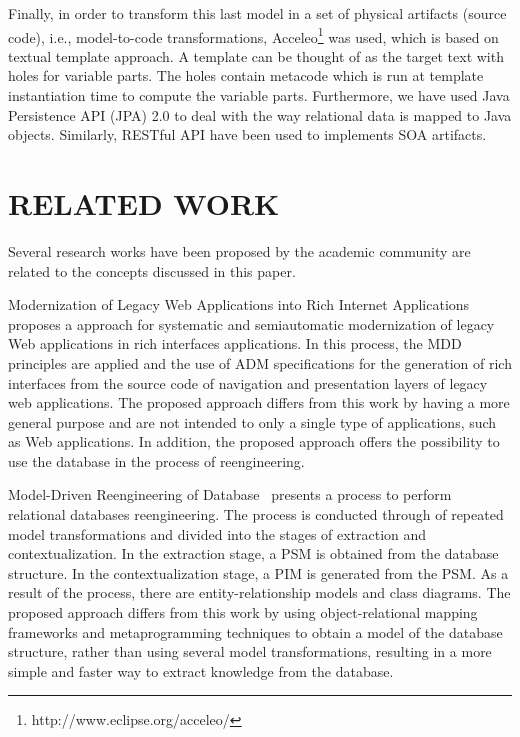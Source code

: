 \documentclass[a4paper,twoside]{article}
\begin{document}
Finally, in order to transform this last model in a set of physical artifacts (source code), i.e., model-to-code transformations, Acceleo\footnote{http://www.eclipse.org/acceleo/} was used, which is based on textual template approach. A template can be thought of as the target text with holes for variable parts. The holes contain metacode which is run at template instantiation time to compute the variable parts. Furthermore, we have used Java Persistence API (JPA) 2.0 to deal with the way relational data is mapped to Java objects. Similarly, RESTful API have been used to implements SOA artifacts. 

\section{\uppercase{Related Work}}\label{sec:related_work}

\noindent Several research works have been proposed by the academic community are related to the concepts discussed in this paper.

Modernization of Legacy Web Applications into Rich Internet Applications~\cite{Rodriguez-Echeverria:2011:MLW:2186508.2186536} proposes a approach for systematic and semiautomatic modernization of legacy Web applications in rich interfaces applications. In this process, the MDD principles are applied and the use of ADM specifications for the generation of rich interfaces from the source code of navigation and presentation layers of legacy web applications. The proposed approach differs from this work by having a more general purpose and are not intended to only a single type of applications, such as Web applications. In addition, the proposed approach offers the possibility to use the database in the process of reengineering.

Model-Driven Reengineering of Database~\cite{5319373}  presents a process to perform relational databases reengineering. The process is conducted through of repeated model transformations and divided into the stages of extraction and contextualization. In the extraction stage, a PSM is obtained from the database structure. In the contextualization stage, a PIM is generated from the PSM. As a result of the process, there are entity-relationship models and class diagrams. The proposed approach differs from this work by using object-relational mapping frameworks and metaprogramming techniques to obtain a model of the database structure, rather than using several model transformations, resulting in a more simple and faster way to extract knowledge from the database.
\end{document}
